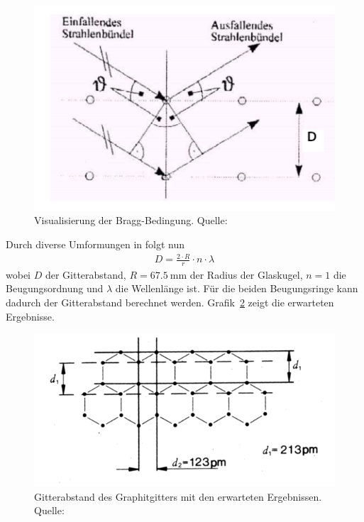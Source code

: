 \documentclass{article}
\begin{document}
\begin{figure}[H]
\includegraphics[scale=1.79]{bragg.png}
\caption{Visualisierung der Bragg-Bedingung. Quelle: \cite{moodle}}
\label{fig:bragg}

\end{figure}

Durch diverse Umformungen in \cite{moodle} folgt nun 
\begin{align}
D = \frac{2\cdot R}{r}\cdot n\cdot \lambda
\label{eq:gitterabstand}
\end{align}
wobei $D$ der Gitterabstand, $R=67.5~$mm der Radius der Glaskugel, $n=1$ die Beugungsordnung und $\lambda$ die Wellenlänge ist. Für die beiden Beugungsringe kann dadurch der Gitterabstand berechnet werden. Grafik~\ref{fig:gitterabst} zeigt die erwarteten Ergebnisse.

\begin{figure}[H]
\includegraphics[scale=2.]{gitterabstand.png}
\caption{Gitterabstand des Graphitgitters mit den erwarteten Ergebnissen. Quelle: \cite{moodle}}
\label{fig:gitterabst}
\end{figure}
\end{document}
